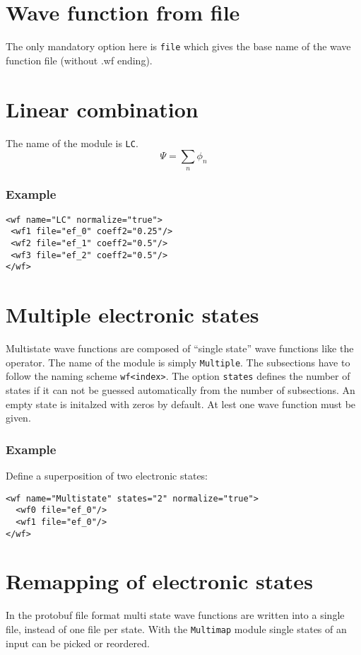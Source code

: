 \documentclass[a4paper,12pt]{scrbook}
\begin{document}
\section{Wave function from file}
The only mandatory option here is \verb|file| which gives the base name of the wave function file
(without .wf ending).

\section{Linear combination}
The name of the module is \verb|LC|.
\begin{equation}
 \Psi = \sum_n \phi_n
\end{equation}

\subsubsection*{Example}
\begin{verbatim}
<wf name="LC" normalize="true">
 <wf1 file="ef_0" coeff2="0.25"/>
 <wf2 file="ef_1" coeff2="0.5"/>
 <wf3 file="ef_2" coeff2="0.5"/>
</wf>
\end{verbatim}


\section{Multiple electronic states}
\label{sec:WFMultistate}

Multistate wave functions are composed of ``single state'' wave functions like the operator.
The name of the module is simply \verb|Multiple|. The subsections have to follow the naming
scheme \verb|wf<index>|. The option \verb|states| defines the number of states if it can not
be guessed automatically from the number of subsections. An empty state is initalzed with zeros
by default. At lest one wave function must be given.

\subsubsection*{Example}
Define a superposition of two electronic states:
\begin{verbatim}
<wf name="Multistate" states="2" normalize="true">
  <wf0 file="ef_0"/>
  <wf1 file="ef_0"/>
</wf>
\end{verbatim}

\section{Remapping of electronic states}
In the protobuf file format multi state wave functions are written into a single file,
instead of one file per state. With the \verb|Multimap| module single states of an input
can be picked or reordered.
\end{document}
